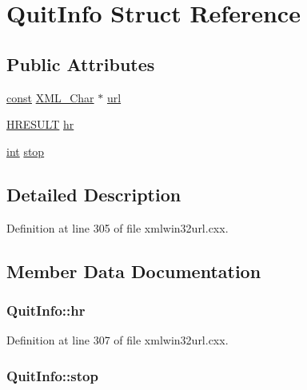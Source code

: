 \hypertarget{struct_quit_info}{}\section{Quit\+Info Struct Reference}
\label{struct_quit_info}
\subsection*{Public Attributes}
\begin{DoxyCompactItemize}
\item 
\hyperlink{getopt1_8c_a2c212835823e3c54a8ab6d95c652660e}{const} \hyperlink{amiga_2include_2libraries_2expat_8h_a63da96463e775e1ec3a7d1f076208127}{X\+M\+L\+\_\+\+Char} $\ast$ \hyperlink{struct_quit_info_ad49635fec369e07bbfb6c720cbd0fa73}{url}
\item 
\hyperlink{px__win__ds_8c_a6ad46d30b0323d7b029e41f32f8a2571}{H\+R\+E\+S\+U\+LT} \hyperlink{struct_quit_info_a8b3a9b275e5c092cd69bba1ae5747bcd}{hr}
\item 
\hyperlink{xmltok_8h_a5a0d4a5641ce434f1d23533f2b2e6653}{int} \hyperlink{struct_quit_info_acb61a6b163a54987a50aaa56141c6110}{stop}
\end{DoxyCompactItemize}


\subsection{Detailed Description}


Definition at line 305 of file xmlwin32url.\+cxx.



\subsection{Member Data Documentation}
\subsubsection[{\texorpdfstring{hr}{hr}}]{ Quit\+Info\+::hr}\hypertarget{struct_quit_info_a8b3a9b275e5c092cd69bba1ae5747bcd}{}\label{struct_quit_info_a8b3a9b275e5c092cd69bba1ae5747bcd}


Definition at line 307 of file xmlwin32url.\+cxx.

\subsubsection[{\texorpdfstring{stop}{stop}}]{ Quit\+Info\+::stop}\hypertarget{struct_quit_info_acb61a6b163a54987a50aaa56141c6110}{}\label{struct_quit_info_acb61a6b163a54987a50aaa56141c6110}


